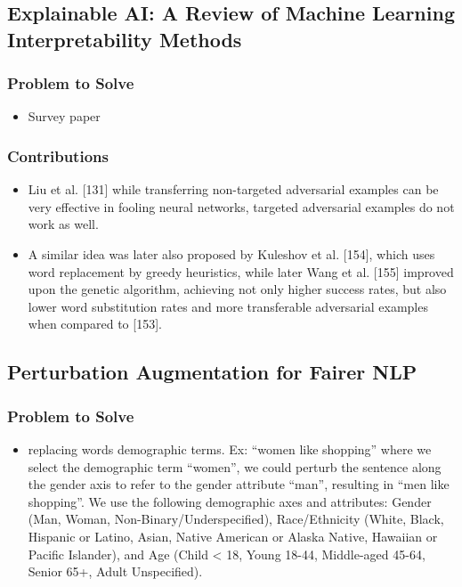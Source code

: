 \documentclass{article}
\begin{document}
\begin{flushleft}


\subsection{ Explainable AI: A Review of Machine Learning Interpretability Methods } 
\subsubsection*{Problem to Solve}
\begin{itemize}
    \item  Survey paper
\end{itemize}

\subsubsection*{Contributions}
\begin{itemize}
 \item  Liu et al. [131] while transferring non-targeted adversarial examples can be very effective in fooling neural networks, targeted adversarial examples do not work as well.
 \item  A similar idea was later also proposed by Kuleshov et al. [154], which uses word replacement by greedy heuristics, while later
Wang et al. [155] improved upon the genetic algorithm, achieving not only higher success rates, but also lower word substitution rates and more transferable adversarial examples when compared to [153].
\end{itemize}





\subsection{Perturbation Augmentation for Fairer NLP} 
\subsubsection*{Problem to Solve}
\begin{itemize}
    \item  replacing words demographic terms. Ex: “women like shopping” where we select the demographic term “women”, we could perturb the sentence along the
gender axis to refer to the gender attribute “man”, resulting in “men like shopping”. We use the following demographic axes and attributes: Gender (Man, Woman, Non-Binary/Underspecified), Race/Ethnicity (White, Black, Hispanic or Latino, Asian, Native American or Alaska Native, Hawaiian or Pacific Islander), and Age (Child < 18, Young 18-44, Middle-aged 45-64, Senior 65+, Adult Unspecified).
\end{itemize}


\end{flushleft}
\end{document}
